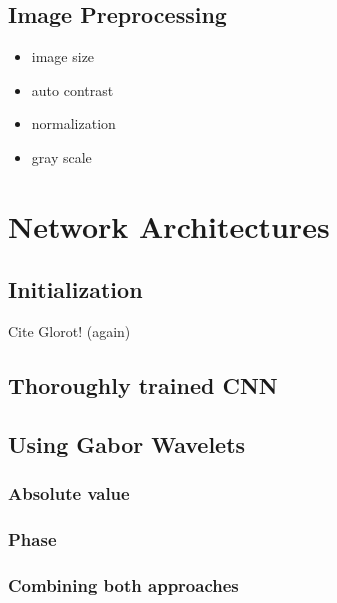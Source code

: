 \documentclass[11pt, a4paper]{article}
\begin{document}
\subsection{Image Preprocessing}

\begin{itemize}
\item image size
\item auto contrast
\item normalization
\item gray scale
\end{itemize}

\newpage


\section{Network Architectures}

\subsection{Initialization}

Cite Glorot! (again)

\subsection{Thoroughly trained CNN}

\subsection{Using Gabor Wavelets}

\subsubsection{Absolute value}
\subsubsection{Phase}
\subsubsection{Combining both approaches}
\end{document}
